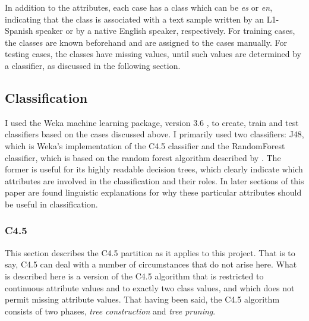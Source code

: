 \documentclass[main.tex]{subfiles}
\begin{document}
In addition to the attributes, each case has a class which can be \textit{es} or \textit{en}, indicating that the class is associated with a text sample written by an L1-Spanish speaker or by a native English speaker, respectively. For training cases, the classes are known beforehand and are assigned to the cases manually. For testing cases, the classes have missing values, until such values are determined by a classifier, as discussed in the following section.

\subsection{Classification}

I used the Weka machine learning package, version 3.6 \citep{hall-et-al:2009}, to create, train and test classifiers based on the cases discussed above. I primarily used two classifiers: J48, which is Weka's implementation of the C4.5 classifier \citep*{quinlan:1993} and the RandomForest classifier, which is based on the random forest algorithm described by \citet{breiman:2001}. The former is useful for its highly readable decision trees, which clearly indicate which attributes are involved in the classification and their roles. In later sections of this paper are found linguistic explanations for why these particular attributes should be useful in classification.
 
\subsubsection{C4.5}

This section describes the C4.5 partition as it applies to this project. That is to say, C4.5 can deal with a number of circumstances that do not arise here. What is described here is a version of the C4.5 algorithm that is restricted to continuous attribute values and to exactly two class values, and which does not permit missing attribute values. That having been said, the C4.5 algorithm consists of two phases, \textit{tree construction} and \textit{tree pruning}.
\end{document}
